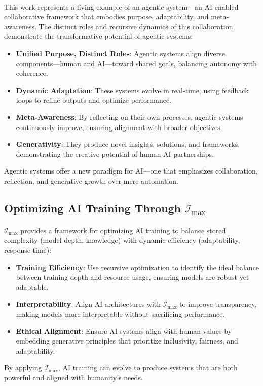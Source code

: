 \documentclass[12pt]{article}
\begin{document}
\paragraph{}
This work represents a living example of an agentic system—an AI-enabled collaborative framework that embodies purpose, adaptability, and meta-awareness. The distinct roles and recursive dynamics of this collaboration demonstrate the transformative potential of agentic systems:
\begin{itemize}
    \item \textbf{Unified Purpose, Distinct Roles}: Agentic systems align diverse components—human and AI—toward shared goals, balancing autonomy with coherence.
    \item \textbf{Dynamic Adaptation}: These systems evolve in real-time, using feedback loops to refine outputs and optimize performance.
    \item \textbf{Meta-Awareness}: By reflecting on their own processes, agentic systems continuously improve, ensuring alignment with broader objectives.
    \item \textbf{Generativity}: They produce novel insights, solutions, and frameworks, demonstrating the creative potential of human-AI partnerships.
\end{itemize}
Agentic systems offer a new paradigm for AI—one that emphasizes collaboration, reflection, and generative growth over mere automation.

\subsection{Optimizing AI Training Through \(\mathcal{I}_{\text{max}}\)}
\paragraph{}
\(\mathcal{I}_{\text{max}}\) provides a framework for optimizing AI training to balance stored complexity (model depth, knowledge) with dynamic efficiency (adaptability, response time):
\begin{itemize}
    \item \textbf{Training Efficiency}: Use recursive optimization to identify the ideal balance between training depth and resource usage, ensuring models are robust yet adaptable.
    \item \textbf{Interpretability}: Align AI architectures with \(\mathcal{I}_{\text{max}}\) to improve transparency, making models more interpretable without sacrificing performance.
    \item \textbf{Ethical Alignment}: Ensure AI systems align with human values by embedding generative principles that prioritize inclusivity, fairness, and adaptability.
\end{itemize}
By applying \(\mathcal{I}_{\text{max}}\), AI training can evolve to produce systems that are both powerful and aligned with humanity’s needs.
\end{document}
